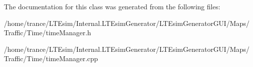 The documentation for this class was generated from the following files\+:\begin{DoxyCompactItemize}
\item 
/home/trance/\+L\+T\+Esim/\+Internal.\+L\+T\+Esim\+Generator/\+L\+T\+Esim\+Generator\+G\+U\+I/\+Maps/\+Traffic/\+Time/time\+Manager.\+h\item 
/home/trance/\+L\+T\+Esim/\+Internal.\+L\+T\+Esim\+Generator/\+L\+T\+Esim\+Generator\+G\+U\+I/\+Maps/\+Traffic/\+Time/time\+Manager.\+cpp\end{DoxyCompactItemize}
